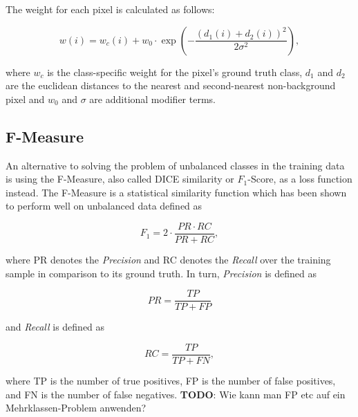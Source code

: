  The weight for each pixel is calculated as follows:

\[ w(i) = w_c(i) + w_0 \cdot \exp \left (- \frac{(d_1(i) + d_2(i))^2}{2\sigma^2} \right ), \]

\noindent where $w_c$ is the class-specific weight for the pixel's ground truth class, $d_1$ and $d_2$ are the euclidean distances to the nearest and second-nearest non-background pixel and $w_0$ and $\sigma$ are additional modifier terms. 

		\subsection{F-Measure}

An alternative to solving the problem of unbalanced classes in the training data is using the F-Measure, also called DICE similarity or $F_1$-Score, as a loss function instead. The F-Measure is a statistical similarity function which has been shown to perform well on unbalanced data\cite{fmeasure1}\cite{fmeasure2}\cite{fmeasure3} defined as

\[F_1 = 2 \cdot \frac{PR \cdot RC}{PR + RC},\]

\noindent where PR denotes the \textit{Precision} and RC denotes the \textit{Recall} over the training sample in comparison to its ground truth. In turn, \textit{Precision} is defined as

\[PR = \frac{TP}{TP + FP}\]

\noindent and \textit{Recall} is defined as

\[RC = \frac{TP}{TP + FN},\]

\noindent where TP is the number of true positives, FP is the number of false positives, and FN is the number of false negatives. \textbf{TODO}: Wie kann man FP etc auf ein Mehrklassen-Problem anwenden?
